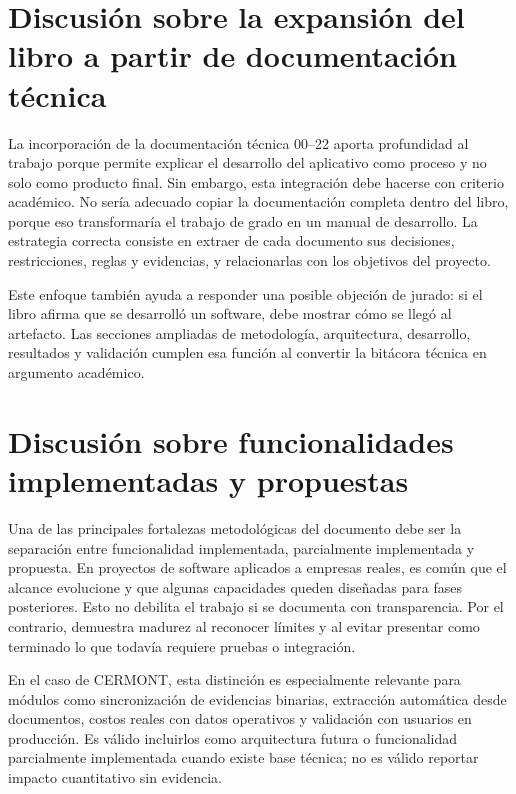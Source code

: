 \section{Discusión sobre la expansión del libro a partir de documentación técnica}
\label{sec:discusion-expansion-documentacion-tecnica}

La incorporación de la documentación técnica 00--22 aporta profundidad al trabajo porque permite explicar el desarrollo del aplicativo como proceso y no solo como producto final. Sin embargo, esta integración debe hacerse con criterio académico. No sería adecuado copiar la documentación completa dentro del libro, porque eso transformaría el trabajo de grado en un manual de desarrollo. La estrategia correcta consiste en extraer de cada documento sus decisiones, restricciones, reglas y evidencias, y relacionarlas con los objetivos del proyecto.

Este enfoque también ayuda a responder una posible objeción de jurado: si el libro afirma que se desarrolló un software, debe mostrar cómo se llegó al artefacto. Las secciones ampliadas de metodología, arquitectura, desarrollo, resultados y validación cumplen esa función al convertir la bitácora técnica en argumento académico.

\section{Discusión sobre funcionalidades implementadas y propuestas}
\label{sec:discusion-implementado-propuesto}

Una de las principales fortalezas metodológicas del documento debe ser la separación entre funcionalidad implementada, parcialmente implementada y propuesta. En proyectos de software aplicados a empresas reales, es común que el alcance evolucione y que algunas capacidades queden diseñadas para fases posteriores. Esto no debilita el trabajo si se documenta con transparencia. Por el contrario, demuestra madurez al reconocer límites y al evitar presentar como terminado lo que todavía requiere pruebas o integración.

En el caso de CERMONT, esta distinción es especialmente relevante para módulos como sincronización de evidencias binarias, extracción automática desde documentos, costos reales con datos operativos y validación con usuarios en producción. Es válido incluirlos como arquitectura futura o funcionalidad parcialmente implementada cuando existe base técnica; no es válido reportar impacto cuantitativo sin evidencia.

